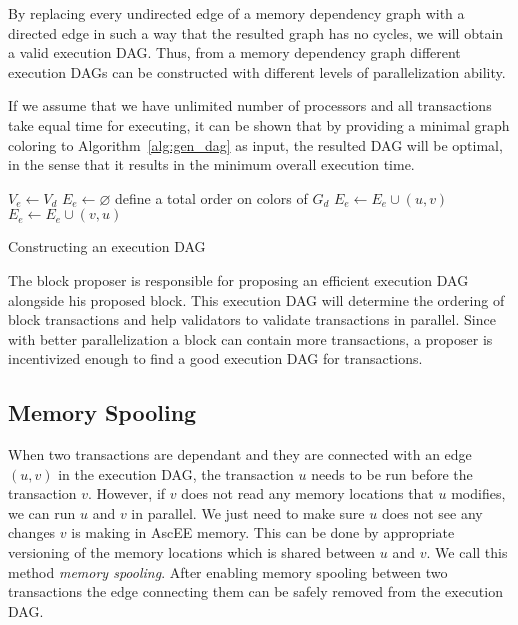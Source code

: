 By replacing every undirected edge of a memory dependency graph with a directed edge in such a way that the
resulted graph has no cycles, we will obtain a valid execution DAG. Thus, from a memory dependency graph different
execution DAGs can be constructed with different levels of parallelization ability.

If we assume that we have unlimited number of processors and all transactions take equal time for executing, it
can be shown that by providing a minimal graph coloring to Algorithm~\ref{alg:gen_dag} as input, the resulted
DAG will be optimal, in the sense that it results in the minimum overall execution time.

\begin{algorithm}
    \DontPrintSemicolon
    \BlankLine
    $V_e \gets V_d$\;
    $E_e \gets \varnothing$\;
    define a total order on colors of $G_d$\;
    {
        {
            $E_e \gets E_e \cup (u,v)$\;
        }{
            $E_e \gets E_e \cup (v,u)$\;
        }
    }
    \caption{Constructing an execution DAG}\label{alg:gen_dag}
\end{algorithm}

The block proposer is responsible for proposing an efficient execution DAG alongside his proposed block. This
execution DAG will determine the ordering of block transactions and help validators to validate transactions in
parallel. Since with better parallelization a block can contain more transactions, a proposer is incentivized enough
to find a good execution DAG for transactions.

\subsection{Memory Spooling}\label{subsec:spooling}

When two transactions are dependant and they are connected with an edge \((u,v)\) in the execution DAG,
the transaction \(u\) needs to be run before the transaction \(v\). However, if \(v\) does not read any
memory locations that \(u\) modifies, we can run \(u\) and \(v\) in parallel. We just need to make sure
\(u\) does not see any changes \(v\) is making in AscEE memory. This can be done by appropriate versioning
of the memory locations which is shared between \(u\) and \(v\). We call this method \emph{memory spooling}.
After enabling memory spooling between two transactions the edge connecting them can be safely removed from the
execution DAG\@.

